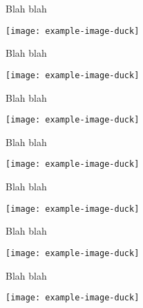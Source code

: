 \documentclass[baselinegrid,showframe,noprint,nocopyright]{uit-thesis-test}
\begin{document}
\frontmatter

\layout

\clearpage\thispagestyle{custom-footer-one}%

Blah blah

\texttt{[image: example-image-duck]}

\vfill

\clearpage\thispagestyle{custom-footer-two}%

Blah blah

\texttt{[image: example-image-duck]}

\vfill

\clearpage\thispagestyle{custom-footer-three}%

Blah blah

\texttt{[image: example-image-duck]}

\vfill

\clearpage\thispagestyle{custom-header-one}%

Blah blah

\texttt{[image: example-image-duck]}

\vfill

\clearpage\thispagestyle{custom-header-two}%

Blah blah

\texttt{[image: example-image-duck]}

\vfill

\makeatletter
{}%
\makeatother

\clearpage\thispagestyle{custom-header-three}%

Blah blah

\texttt{[image: example-image-duck]}

\vfill

\restoregeometry
\clearpage\thispagestyle{fancy}%

Blah blah

\texttt{[image: example-image-duck]}
\end{document}

